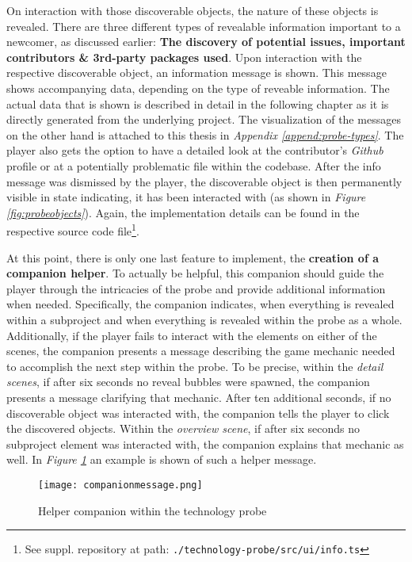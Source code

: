 On interaction with those discoverable objects, the nature of these objects is revealed. There are three different types of revealable information important to a newcomer, as discussed earlier: \textbf{The discovery of potential issues, important contributors \& 3rd-party packages used}. Upon interaction with the respective discoverable object, an information message is shown. This message shows accompanying data, depending on the type of reveable information. The actual data that is shown is described in detail in the following chapter as it is directly generated from the underlying project. The visualization of the messages on the other hand is attached to this thesis in \textit{Appendix \ref{append:probe-types}}. The player also gets the option to have a detailed look at the contributor's \textit{Github} profile or at a potentially problematic file within the codebase. After the info message was dismissed by the player, the discoverable object is then permanently visible in state indicating, it has been interacted with (as shown in \textit{Figure \ref{fig:probeobjects}}). Again, the implementation details can be found in the respective source code file\footnote{See suppl. repository at path: \texttt{./technology-probe/src/ui/info.ts}}.

At this point, there is only one last feature to implement, the \textbf{creation of a companion helper}. To actually be helpful, this companion should guide the player through the intricacies of the probe and provide additional information when needed. Specifically, the companion indicates, when everything is revealed within a subproject and when everything is revealed within the probe as a whole. Additionally, if the player fails to interact with the elements on either of the scenes, the companion presents a message describing the game mechanic needed to accomplish the next step within the probe. To be precise, within the \textit{detail scenes}, if after six seconds no reveal bubbles were spawned, the companion presents a message clarifying that mechanic. After ten additional seconds, if no discoverable object was interacted with, the companion tells the player to click the discovered objects. Within the \textit{overview scene}, if after six seconds no subproject element was interacted with, the companion explains that mechanic as well. In \textit{Figure \ref{fig:companion}} an example is shown of such a helper message.

\begin{figure}[h]
  \centering
  \texttt{[image: companionmessage.png]}
  \caption{Helper companion within the technology probe}
  \label{fig:companion}
\end{figure}


